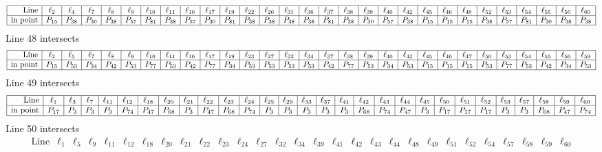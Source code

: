 \documentclass{article}
\begin{document}
{$$\begin{array}{|r*{28}{|c}|}
\hline
\mbox{Line}  & \ell_{2} & \ell_{4} & \ell_{7} & \ell_{8} & \ell_{9} & \ell_{10} & \ell_{11} & \ell_{16} & \ell_{17} & \ell_{19} & \ell_{22} & \ell_{26} & \ell_{31} & \ell_{36} & \ell_{37} & \ell_{38} & \ell_{39} & \ell_{40} & \ell_{42} & \ell_{45} & \ell_{46} & \ell_{48} & \ell_{52} & \ell_{53} & \ell_{54} & \ell_{55} & \ell_{56} & \ell_{60}\\
\hline
\mbox{in point}  & P_{15} & P_{38} & P_{30} & P_{38} & P_{57} & P_{81} & P_{38} & P_{57} & P_{30} & P_{81} & P_{38} & P_{38} & P_{38} & P_{38} & P_{81} & P_{38} & P_{30} & P_{57} & P_{38} & P_{15} & P_{15} & P_{15} & P_{38} & P_{57} & P_{81} & P_{30} & P_{38} & P_{38}\\
\hline
\end{array}
$$
Line 48 intersects 
$$
\begin{array}{|r*{28}{|c}|}
\hline
\mbox{Line}  & \ell_{2} & \ell_{5} & \ell_{7} & \ell_{8} & \ell_{9} & \ell_{10} & \ell_{11} & \ell_{16} & \ell_{17} & \ell_{19} & \ell_{23} & \ell_{27} & \ell_{32} & \ell_{34} & \ell_{37} & \ell_{38} & \ell_{39} & \ell_{40} & \ell_{43} & \ell_{45} & \ell_{46} & \ell_{47} & \ell_{50} & \ell_{53} & \ell_{54} & \ell_{55} & \ell_{56} & \ell_{59}\\
\hline
\mbox{in point}  & P_{15} & P_{53} & P_{34} & P_{42} & P_{53} & P_{77} & P_{53} & P_{42} & P_{77} & P_{34} & P_{53} & P_{53} & P_{53} & P_{53} & P_{42} & P_{77} & P_{53} & P_{34} & P_{53} & P_{15} & P_{15} & P_{15} & P_{53} & P_{77} & P_{53} & P_{42} & P_{34} & P_{53}\\
\hline
\end{array}
$$
Line 49 intersects 
$$
\begin{array}{|r*{28}{|c}|}
\hline
\mbox{Line}  & \ell_{1} & \ell_{3} & \ell_{7} & \ell_{11} & \ell_{12} & \ell_{18} & \ell_{20} & \ell_{21} & \ell_{22} & \ell_{23} & \ell_{24} & \ell_{25} & \ell_{29} & \ell_{33} & \ell_{37} & \ell_{41} & \ell_{42} & \ell_{43} & \ell_{44} & \ell_{45} & \ell_{50} & \ell_{51} & \ell_{52} & \ell_{53} & \ell_{57} & \ell_{58} & \ell_{59} & \ell_{60}\\
\hline
\mbox{in point}  & P_{17} & P_{3} & P_{3} & P_{3} & P_{74} & P_{47} & P_{68} & P_{3} & P_{47} & P_{68} & P_{74} & P_{3} & P_{3} & P_{3} & P_{3} & P_{3} & P_{68} & P_{74} & P_{47} & P_{3} & P_{17} & P_{17} & P_{17} & P_{3} & P_{3} & P_{68} & P_{47} & P_{74}\\
\hline
\end{array}
$$
Line 50 intersects 
$$
\begin{array}{|r*{28}{|c}|}
\hline
\mbox{Line}  & \ell_{1} & \ell_{5} & \ell_{9} & \ell_{11} & \ell_{12} & \ell_{18} & \ell_{20} & \ell_{21} & \ell_{22} & \ell_{23} & \ell_{24} & \ell_{27} & \ell_{32} & \ell_{34} & \ell_{39} & \ell_{41} & \ell_{42} & \ell_{43} & \ell_{44} & \ell_{48} & \ell_{49} & \ell_{51} & \ell_{52} & \ell_{54} & \ell_{57} & \ell_{58} & \ell_{59} & \ell_{60}\\

\end{array}$$}
\end{document}
